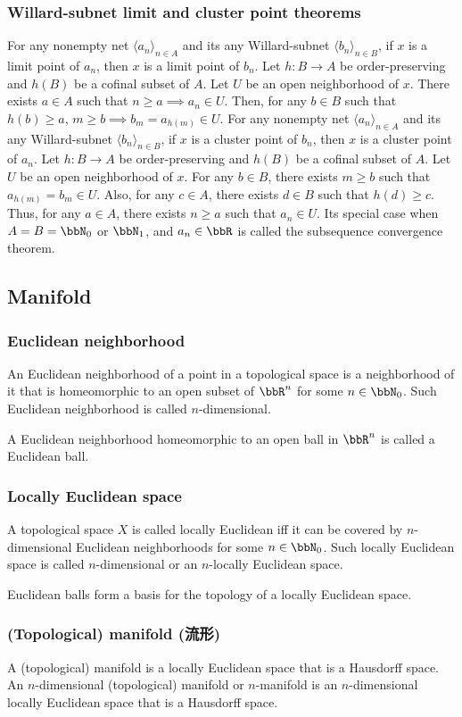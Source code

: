 \documentclass[a4paper,12pt]{article}
\begin{document}
\subsubsection{Willard-subnet limit and cluster point theorems}
For any nonempty net $\langle a_n\rangle_{n\in A}$ and its any Willard-subnet $\langle b_n\rangle_{n\in B}$, if $x$ is a limit point of $a_n$, then $x$ is a limit point of $b_n$.
\bpr
Let $h\colon B\to A$ be order-preserving and $h(B)$ be a cofinal subset of $A$. Let $U$ be an open neighborhood of $x$. There exists $a\in A$ such that $n\geq a\implies a_n\in U$. Then, for any $b\in B$ such that $h(b)\geq a$, $m\geq b\implies b_m=a_{h(m)}\in U$.
\epr
For any nonempty net $\langle a_n\rangle_{n\in A}$ and its any Willard-subnet $\langle b_n\rangle_{n\in B}$, if $x$ is a cluster point of $b_n$, then $x$ is a cluster point of $a_n$.
\bpr
Let $h\colon B\to A$ be order-preserving and $h(B)$ be a cofinal subset of $A$. Let $U$ be an open neighborhood of $x$. For any $b\in B$, there exists $m\geq b$ such that $a_{h(m)}=b_m\in U$. Also, for any $c\in A$, there exists $d\in B$ such that $h(d)\geq c$. Thus, for any $a\in A$, there exists $n\geq a$ such that $a_n\in U$.
\epr
Its special case when $A=B=\bbN_0$ or $\bbN_1$, and $a_n\in\bbR$ is called the subsequence convergence theorem.
\subsection{Manifold}
\subsubsection{Euclidean neighborhood}
An Euclidean neighborhood of a point in a topological space is a neighborhood of it that is homeomorphic to an open subset of $\bbR^n$ for some $n\in\bbN_0$. Such Euclidean neighborhood is called $n$-dimensional.

A Euclidean neighborhood homeomorphic to an open ball in $\bbR^n$ is called a Euclidean ball.
\subsubsection{Locally Euclidean space}
A topological space $X$ is called locally Euclidean iff it can be covered by $n$-dimensional Euclidean neighborhoods for some $n\in\bbN_0$. Such locally Euclidean space is called $n$-dimensional or an $n$-locally Euclidean space.

Euclidean balls form a basis for the topology of a locally Euclidean space.
\subsubsection{(Topological) manifold (流形)}
A (topological) manifold is a locally Euclidean space that is a Hausdorff space. An $n$-dimensional (topological) manifold or $n$-manifold is an $n$-dimensional locally Euclidean space that is a Hausdorff space.
\end{document}
